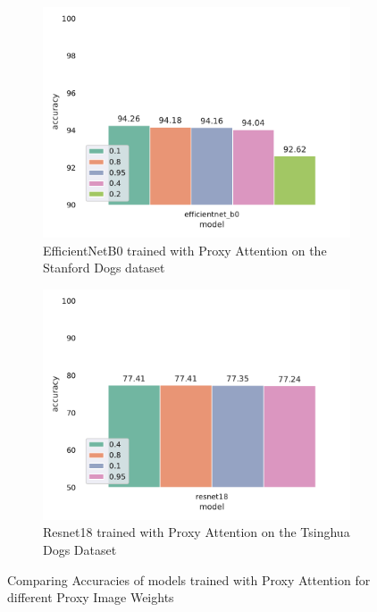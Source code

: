 \begin{figure}[H]
    \begin{subfigure}[h]{.5\textwidth}
        \includegraphics[width=\linewidth, right]{results/proxy_weight_results.pdf}
        \caption{EfficientNetB0 \cite{tanEfficientnetRethinkingModel2019} trained with Proxy Attention on the Stanford Dogs dataset\cite{khoslaNovelDatasetFineGrained}}
    \end{subfigure}
    \begin{subfigure}[h]{.5\textwidth}
        \includegraphics[width=\linewidth, left]{results/proxy_weight_results_tsing.pdf}
        \caption{Resnet18 \cite{heDeepResidualLearning2016} trained with Proxy Attention on the Tsinghua Dogs Dataset \cite{zouNewDatasetDog2020}}
    \end{subfigure}
    
    \caption{Comparing Accuracies of models trained with Proxy Attention for different Proxy Image Weights}
    \label{fig:proxy_weight}
\end{figure}

